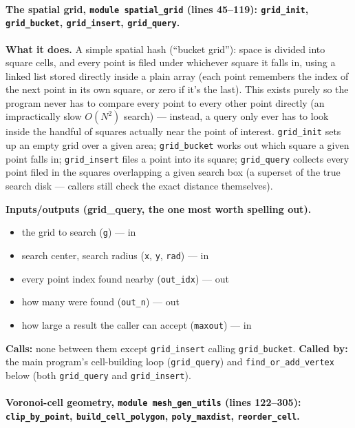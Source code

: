 \documentclass[11pt]{article}
\begin{document}
\paragraph{The spatial grid, \texttt{module spatial\_grid} (lines 45--119): \texttt{grid\_init},
\texttt{grid\_bucket}, \texttt{grid\_insert}, \texttt{grid\_query}.}
\textbf{What it does.} A simple spatial hash (``bucket grid''): space is divided into
square cells, and every point is filed under whichever square it falls in, using a
linked list stored directly inside a plain array (each point remembers the index of the
next point in its own square, or zero if it's the last). This exists purely so the
program never has to compare every point to every other point directly (an
impractically slow $O(N^2)$ search) --- instead, a query only ever has to look inside
the handful of squares actually near the point of interest. \texttt{grid\_init} sets up
an empty grid over a given area; \texttt{grid\_bucket} works out which square a given
point falls in; \texttt{grid\_insert} files a point into its square; \texttt{grid\_query}
collects every point filed in the squares overlapping a given search box (a superset of
the true search disk --- callers still check the exact distance themselves).

\textbf{Inputs/outputs (grid\_query, the one most worth spelling out).}
\begin{itemize}[nosep]
  \item the grid to search (\texttt{g}) --- in
  \item search center, search radius (\texttt{x}, \texttt{y}, \texttt{rad}) --- in
  \item every point index found nearby (\texttt{out\_idx}) --- out
  \item how many were found (\texttt{out\_n}) --- out
  \item how large a result the caller can accept (\texttt{maxout}) --- in
\end{itemize}

\textbf{Calls:} none between them except \texttt{grid\_insert} calling \texttt{grid\_bucket}.
\textbf{Called by:} the main program's cell-building loop (\texttt{grid\_query}) and
\texttt{find\_or\_add\_vertex} below (both \texttt{grid\_query} and \texttt{grid\_insert}).

\paragraph{Voronoi-cell geometry, \texttt{module mesh\_gen\_utils} (lines 122--305):
\texttt{clip\_by\_point}, \texttt{build\_cell\_polygon}, \texttt{poly\_maxdist},
\texttt{reorder\_cell}.}
\end{document}
